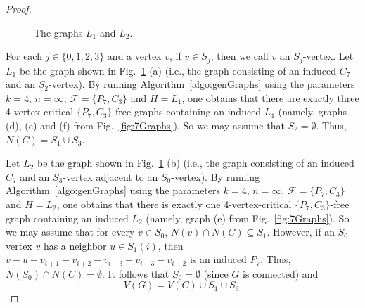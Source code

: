 \documentclass[11pt,a4paper]{article}
\theoremstyle{definition}
\begin{document}
\begin{proof}
    \begin{figure}[h!]
\begin{center}
 \quad
{}
\end{center}
\caption{The graphs $L_1$ and $L_2$.}\label{fig:2Graphs} 
\end{figure}

    For each $j\in \{0,1,2,3\}$ and a vertex $v$, if $v\in S_j$, then we call $v$ an $S_j$-vertex. Let $L_1$ be the graph shown in Fig.~\ref{fig:2Graphs} (a) (i.e., the graph consisting of an induced $C_7$ and an $S_2$-vertex). By running Algorithm~\ref{algo:genGraphs} using the parameters $k=4$, $n=\infty$, $\mathcal{F}=\{P_7,C_3\}$ and $H=L_1$, one obtains that there are exactly three 4-vertex-critical $\{P_7,C_3\}$-free graphs containing an induced $L_1$ (namely, graphs (d), (e) and (f) from Fig.~\ref{fig:7Graphs}). So we may assume that $S_2=\emptyset$. 
    Thus, $N(C)=S_1\cup S_3$.

    Let $L_2$ be the graph shown in Fig.~\ref{fig:2Graphs} (b) (i.e., the graph consisting of an induced $C_7$ and an $S_3$-vertex adjacent to an $S_0$-vertex). By running Algorithm~\ref{algo:genGraphs} using the parameters $k=4$, $n=\infty$, $\mathcal{F}=\{P_7,C_3\}$ and $H=L_2$, one obtains that there is exactly one 4-vertex-critical $\{P_7,C_3\}$-free graph containing an induced $L_2$ (namely, graph (e) from Fig.~\ref{fig:7Graphs}). So we may assume that for every $v\in S_0$, $N(v)\cap N(C)\subseteq S_1$.  
    However, if an $S_0$-vertex $v$ has a neighbor $u\in S_1(i)$, then $v-u-v_{i+1}-v_{i+2}-v_{i+3}-v_{i-3}-v_{i-2}$ is an induced $P_7$. 
    Thus, $N(S_0)\cap N(C)=\emptyset$. 
    It follows that $S_0=\emptyset$ (since $G$ is connected) and 
    \begin{equation}\label{eqn-1} 
        V(G)=V(C)\cup S_1\cup S_3.
    \end{equation}
    


\end{proof}
\end{document}
